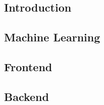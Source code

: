 \subsection{Introduction}


\subsection{Machine Learning}


\subsection{Frontend}


\subsection{Backend}
